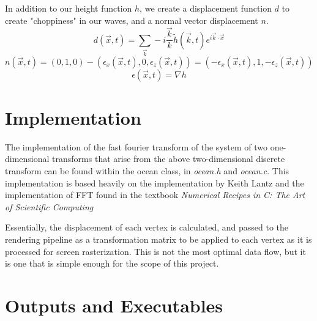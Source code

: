 \documentclass[11pt]{article} %
\begin{document}
\par In addition to our height function $h$, we create a displacement function $d$ to create "choppiness" in our waves, and a normal vector displacement $n$.
	$$d(\vec{x},t) = \sum_{\vec{k}} - i \frac{\vec{k}}{k}\tilde{h}(\vec{k},t)e^{i\vec{k} \cdot \vec{x}}$$
	$$n(\vec{x},t) = (0,1,0) - (\epsilon_x(\vec{x},t),0,\epsilon_z(\vec{x},t)) = (-\epsilon_x(\vec{x},t),1,-\epsilon_z(\vec{x},t))$$
	$$\epsilon(\vec{x},t) = \nabla h$$
\section*{Implementation}
The implementation of the fast fourier transform of the system of two one-dimensional transforms that arise from the above two-dimensional discrete transform can be found within the ocean class, in \textit{ocean.h} and \textit{ocean.c}. This implementation is based heavily on the implementation by Keith Lantz and the implementation of FFT found in the textbook \textit{Numerical Recipes in C: The Art of Scientific Computing}
\par Essentially, the displacement of each vertex is calculated, and passed to the rendering pipeline as a transformation matrix to be applied to each
vertex as it is processed for screen rasterization. This is not the most optimal data flow, but it is one that is simple enough for the scope of this project.
\section*{Outputs and Executables}
\end{document}
